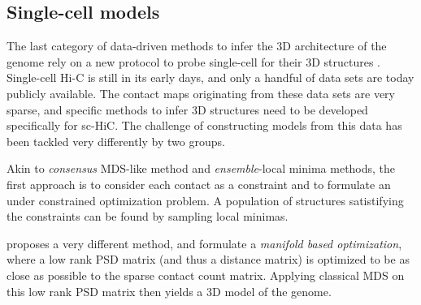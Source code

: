 \documentclass[letterpaper,12pt]{article}
\begin{document}
\subsection*{Single-cell models}

The last category of data-driven methods to infer the 3D architecture of the
genome rely on a new protocol to probe single-cell for their 3D structures
\citep{nagano:single-cell,ramani:massively}. Single-cell Hi-C is still in its early days,
and only a handful of data sets are today publicly available. The contact maps
originating from these data sets are very sparse, and specific methods to
infer 3D structures need to be developed specifically for sc-HiC. The
challenge of constructing models from this data has been tackled very
differently by two groups. 

Akin to {\em consensus} MDS-like method and {\em ensemble}-local minima
methods,  the first approach is to consider each contact as a constraint and
to formulate
an under constrained optimization problem. A population of structures
satistifying the constraints can be found by sampling local minimas.

\citet{paulsen:manifold} proposes a very different method, and formulate a
\textit{manifold based optimization}, where a low rank PSD matrix (and thus a
distance matrix) is optimized to be as close as possible to the sparse contact
count matrix. Applying classical MDS on this low rank PSD matrix then yields a
3D model of the genome.
\end{document}

